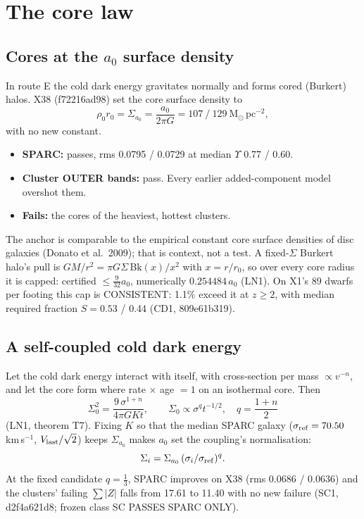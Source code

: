 \documentclass[10pt]{article}
\begin{document}
\section{The core law}
\subsection{Cores at the $a_0$ surface density}
In route E the cold dark energy gravitates normally and forms cored (Burkert) halos. X38 (f72216ad98) set the core surface density to
\[
\rho_0r_0=\Sigma_{a_0}=\frac{a_0}{2\pi G}=107\ /\ 129\ \mathrm{M_\odot\,pc^{-2}},
\]
with no new constant.
\begin{itemize}
\item \textbf{SPARC:} passes, rms 0.0795 / 0.0729 at median $\Upsilon$ 0.77 / 0.60.
\item \textbf{Cluster OUTER bands:} pass. Every earlier added-component model overshot them.
\item \textbf{Fails:} the cores of the heaviest, hottest clusters.
\end{itemize}
The anchor is comparable to the empirical constant core surface densities of disc galaxies (Donato et al.\ 2009); that is context, not a test. A fixed-$\Sigma$ Burkert halo's pull is $G M/r^2=\pi G\Sigma\,\mathrm{Bk}(x)/x^2$ with $x=r/r_0$, so over every core radius it is capped: certified $\le\tfrac{9}{32}a_0$, numerically $0.254484\,a_0$ (LN1). On X1's 89 dwarfs per footing this cap is CONSISTENT: 1.1\% exceed it at $z\ge2$, with median required fraction $S=0.53$ / 0.44 (CD1, 809e61b319).

\subsection{A self-coupled cold dark energy}
Let the cold dark energy interact with itself, with cross-section per mass $\propto v^{-n}$, and let the core form where rate $\times$ age $=1$ on an isothermal core. Then
\[
\Sigma_0^2=\frac{9\,\sigma^{1+n}}{4\pi G K t},\qquad \Sigma_0\propto\sigma^{q}t^{-1/2},\quad q=\frac{1+n}{2}
\]
(LN1, theorem T7). Fixing $K$ so that the median SPARC galaxy ($\sigma_{\rm ref}=70.50$\,km\,s$^{-1}$, $V_{\rm last}/\sqrt2$) keeps $\Sigma_{a_0}$ makes $a_0$ set the coupling's normalisation:
\[
\Sigma_i=\Sigma_{a_0}\,(\sigma_i/\sigma_{\rm ref})^{q}.
\]
At the fixed candidate $q=\tfrac13$, SPARC improves on X38 (rms 0.0686 / 0.0636) and the clusters' failing $\sum|Z|$ falls from 17.61 to 11.40 with no new failure (SC1, d2f4a621d8; frozen class SC PASSES SPARC ONLY).
\end{document}
